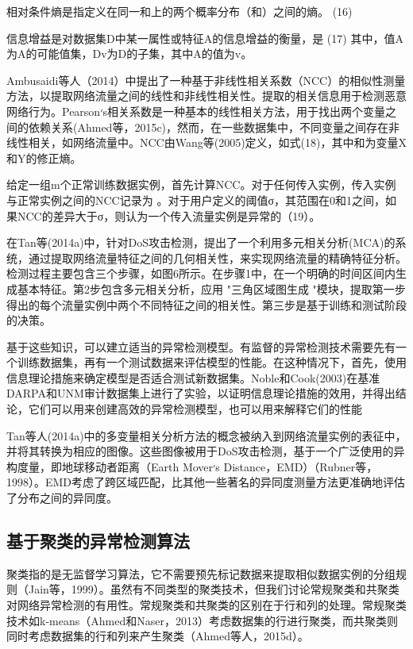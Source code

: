 相对条件熵是指定义在同一和上的两个概率分布（和）之间的熵。
(16)

信息增益是对数据集D中某一属性或特征A的信息增益的衡量，是
(17)
其中，值A为A的可能值集，Dv为D的子集，其中A的值为v。


Ambusaidi等人（2014）中提出了一种基于非线性相关系数（NCC）的相似性测量方法，以提取网络流量之间的线性和非线性相关性。提取的相关信息用于检测恶意网络行为。Pearson׳s相关系数是一种基本的线性相关方法，用于找出两个变量之间的依赖关系(Ahmed等，2015c)，然而，在一些数据集中，不同变量之间存在非线性相关，如网络流量中。NCC由Wang等(2005)定义，如式(18)，其中和为变量X和Y的修正熵。

给定一组m个正常训练数据实例，首先计算NCC。对于任何传入实例，传入实例与正常实例之间的NCC记录为 。对于用户定义的阈值σ，其范围在0和1之间，如果NCC的差异大于σ，则认为一个传入流量实例是异常的（19）。


在Tan等(2014a)中，针对DoS攻击检测，提出了一个利用多元相关分析(MCA)的系统，通过提取网络流量特征之间的几何相关性，来实现网络流量的精确特征分析。检测过程主要包含三个步骤，如图6所示。在步骤1中，在一个明确的时间区间内生成基本特征。第2步包含多元相关分析，应用 "三角区域图生成 "模块，提取第一步得出的每个流量实例中两个不同特征之间的相关性。第三步是基于训练和测试阶段的决策。


基于这些知识，可以建立适当的异常检测模型。有监督的异常检测技术需要先有一个训练数据集，再有一个测试数据来评估模型的性能。在这种情况下，首先，使用信息理论措施来确定模型是否适合测试新数据集。Noble和Cook(2003)在基准DARPA和UNM审计数据集上进行了实验，以证明信息理论措施的效用，并得出结论，它们可以用来创建高效的异常检测模型，也可以用来解释它们的性能

Tan等人(2014a)中的多变量相关分析方法的概念被纳入到网络流量实例的表征中，并将其转换为相应的图像。这些图像被用于DoS攻击检测，基于一个广泛使用的异构度量，即地球移动者距离（Earth Mover׳s Distance，EMD）（Rubner等，1998）。EMD考虑了跨区域匹配，比其他一些著名的异同度测量方法更准确地评估了分布之间的异同度。

\subsection{基于聚类的异常检测算法}

聚类指的是无监督学习算法，它不需要预先标记数据来提取相似数据实例的分组规则（Jain等，1999）。虽然有不同类型的聚类技术，但我们讨论常规聚类和共聚类对网络异常检测的有用性。常规聚类和共聚类的区别在于行和列的处理。常规聚类技术如k-means（Ahmed和Naser，2013）考虑数据集的行进行聚类，而共聚类则同时考虑数据集的行和列来产生聚类（Ahmed等人，2015d）。

